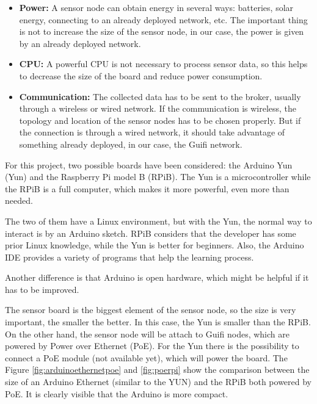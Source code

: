 \documentclass[12pt, a4paper,twoside]{tesi_upf}
\begin{document}
    \begin{itemize}
    	\item {\bf Power:} A sensor node can obtain energy in several ways: batteries, solar energy, connecting to an already deployed network, etc. The important thing is not to increase the size of the sensor node, in our case, the power is given by an already deployed network.
    	\item {\bf CPU:} A powerful CPU is not necessary to process sensor data, so this helps to decrease the size of the board and reduce power consumption.
    	\item {\bf Communication:} The collected data has to be sent to the broker, usually through a wireless or wired network. If the communication is wireless, the topology and location of the sensor nodes has to be chosen properly. But if the connection is through a wired network, it should take advantage of something already deployed, in our case, the Guifi network.
    \end{itemize}
    
    For this project, two possible boards have been considered: the Arduino Yun (Yun) and the Raspberry Pi model B (RPiB). The Yun is a microcontroller while the RPiB is a full computer, which makes it more powerful, even more than needed.
    
    The two of them have a Linux environment, but with the Yun, the normal way to interact is by an Arduino sketch. RPiB considers that the developer has some prior Linux knowledge, while the Yun is better for beginners. Also, the Arduino IDE provides a variety of programs that help the learning process.
    
    Another difference is that Arduino is open hardware, which might be helpful if it has to be improved.
    
    The sensor board is the biggest element of the sensor node, so the size is very important, the smaller the better. In this case, the Yun is smaller than the RPiB. On the other hand, the sensor node will be attach to Guifi nodes, which are powered by Power over Ethernet (PoE). 
    For the Yun there is the possibility to connect a PoE module (not available yet), which will power the board. The Figure \ref{fig:arduinoethernetpoe} and \ref{fig:poerpi} show the comparison between the size of an Arduino Ethernet (similar to the YUN) and the RPiB both powered by PoE. It is clearly visible that the Arduino is more compact.
    
\end{document}
